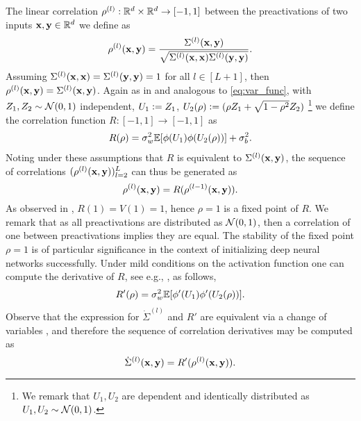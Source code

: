 The linear correlation $\rho^{(l)}: \mathbb{R}^d \times \mathbb{R}^d \rightarrow [-1,1]$ between the preactivations of two inputs $\mathbf x, \mathbf y \in \mathbb{R}^d$ we define as
\begin{equation}
   \begin{aligned}
        \rho^{(l)}(\mathbf x, \mathbf y) = \frac{\Sigma^{(l)}(\mathbf x, \mathbf y)}{\sqrt{\Sigma^{(l)}(\mathbf x, \mathbf x)\Sigma^{(l)}(\mathbf y, \mathbf y)}} . 
\end{aligned} 
\end{equation}
Assuming $\Sigma^{(l)}(\mathbf x, \mathbf x) = \Sigma^{(l)}(\mathbf y, \mathbf y) = 1$ for all $l \in [L+1]$, then $\rho^{(l)}(\mathbf x, \mathbf y) =  \Sigma^{(l)}(\mathbf x, \mathbf y)$.  Again as in \cite{MURRAY2022117} and analogous to \eqref{eq:var_func}, with $Z_1,Z_2 \sim \mathcal{N}(0,1)$ independent, $U_1 \vcentcolon= Z_1$, $U_2(\rho) \vcentcolon= (\rho Z_1 + \sqrt{1- \rho^2}Z_2)$ \footnote{We remark that $U_1, U_2$ are dependent and identically distributed as $U_1, U_2  \sim \mathcal{N}(0, 1)$.} 
we define the correlation function $R: [-1,1] \rightarrow [-1,1]$ as
\begin{equation} \label{eq:corr_map}
\begin{aligned}
    R(\rho) = \sigma_w^2 \mathbb{E}[\phi(U_1) \phi(U_2(\rho))] + \sigma_b^2.
\end{aligned}
\end{equation}
Noting under these assumptions that $R$ is equivalent to $\Sigma^{(l)}(\mathbf x, \mathbf y)$, the sequence of correlations $(\rho^{(l)}(\mathbf x,\mathbf y))_{l=2}^L$ can thus be generated as 
\[
\rho^{(l)}(\mathbf x, \mathbf y) = R(\rho^{(l-1)}(\mathbf x, \mathbf y)).
\]
As observed in \cite{Poole2016,samuel2017}, $R(1) = V(1) = 1$, hence $\rho=1$ is a fixed point of $R$. We remark that as all preactivations are distributed as $\mathcal{N}(0,1)$, then a correlation of one between preactivations implies they are equal. The stability of the fixed point $\rho =1$ is of particular significance in the context of initializing deep neural networks successfully. Under mild conditions on the activation function one can compute the derivative of $R$, see e.g., \cite{Poole2016, samuel2017, MURRAY2022117}, as follows,
\begin{equation} \label{eq:corr_map_diff}
\begin{aligned}
    R'(\rho) = \sigma_w^2 \mathbb{E}[\phi'(U_1) \phi'(U_2(\rho))].
\end{aligned}
\end{equation}
Observe that the expression for $\dot{\Sigma}^{(l)}$ and $R'$ are equivalent via a change of variables \citep{Poole2016}, and therefore the sequence of correlation derivatives may be computed as
\[
\dot{\Sigma}^{(l)}(\mathbf x, \mathbf y) = R'(\rho^{(l)}(\mathbf x, \mathbf y)).
\]



